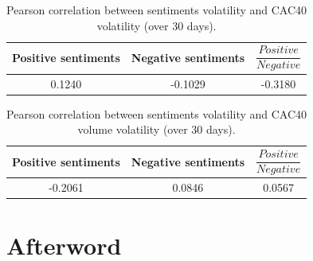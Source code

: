 \documentclass[12pt]{report}
\begin{document}
			\begin{table}
			\begin{center}
			\begin{tabular}{|c | c | c|}
				\hline
				Positive sentiments & Negative sentiments & $\dfrac{Positive}{Negative}$\\
				\hline
				0.1240 & -0.1029 & -0.3180\\
				\hline
			\end{tabular}
			\end{center}
			
			\caption{Pearson correlation between sentiments volatility and CAC40 volatility (over 30 days).\label{pearson_vol_cac}}
			\end{table}

			\begin{table}
			\begin{center}
			\begin{tabular}{|c | c | c|}
				\hline
				Positive sentiments & Negative sentiments & $\dfrac{Positive}{Negative}$\\
				\hline
				-0.2061 & 0.0846 & 0.0567\\
				\hline
			\end{tabular}
			\end{center}
			
			\caption{Pearson correlation between sentiments volatility and CAC40 volume volatility (over 30 days).\label{pearson_vol_vol}}
			\end{table}
	
	\chapter{Afterword}
		
\end{document}
